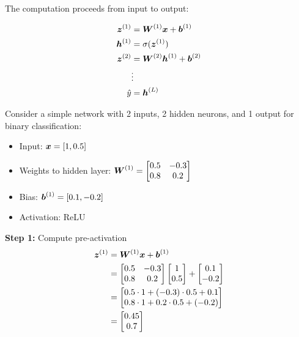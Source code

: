The computation proceeds from input to output:

\begin{align}
\boldsymbol{z}^{(1)} &= \boldsymbol{W}^{(1)} \boldsymbol{x} + \boldsymbol{b}^{(1)} \\
\boldsymbol{h}^{(1)} &= \sigma(\boldsymbol{z}^{(1)}) \\
\boldsymbol{z}^{(2)} &= \boldsymbol{W}^{(2)} \boldsymbol{h}^{(1)} + \boldsymbol{b}^{(2)} \\
&\vdots \\
\hat{y} &= \boldsymbol{h}^{(L)}
\end{align}

\begin{example}
\label{ex:forward-pass}

Consider a simple network with 2 inputs, 2 hidden neurons, and 1 output for binary classification:

\begin{itemize}
    \item Input: $\boldsymbol{x} = [1, 0.5]$
    \item Weights to hidden layer: $\boldsymbol{W}^{(1)} = \begin{bmatrix} 0.5 & -0.3 \\ 0.8 & 0.2 \end{bmatrix}$
    \item Bias: $\boldsymbol{b}^{(1)} = [0.1, -0.2]$
    \item Activation: ReLU
\end{itemize}

\textbf{Step 1:} Compute pre-activation
\begin{align}
\boldsymbol{z}^{(1)} &= \boldsymbol{W}^{(1)} \boldsymbol{x} + \boldsymbol{b}^{(1)} \\
&= \begin{bmatrix} 0.5 & -0.3 \\ 0.8 & 0.2 \end{bmatrix} \begin{bmatrix} 1 \\ 0.5 \end{bmatrix} + \begin{bmatrix} 0.1 \\ -0.2 \end{bmatrix} \\
&= \begin{bmatrix} 0.5 \cdot 1 + (-0.3) \cdot 0.5 + 0.1 \\ 0.8 \cdot 1 + 0.2 \cdot 0.5 + (-0.2) \end{bmatrix} \\
&= \begin{bmatrix} 0.45 \\ 0.7 \end{bmatrix}
\end{align}


\end{example}
